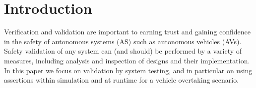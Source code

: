 

\section{Introduction}

Verification and validation are important to earning trust and gaining confidence in the safety of autonomous systems (AS) such as autonomous vehicles (AVs). Safety validation of any system can (and should) be performed by a variety of measures, including analysis and inspection of designs and their implementation. In this paper we focus on validation by system testing, and in particular on using assertions within simulation and at runtime for a vehicle overtaking scenario. 
%

